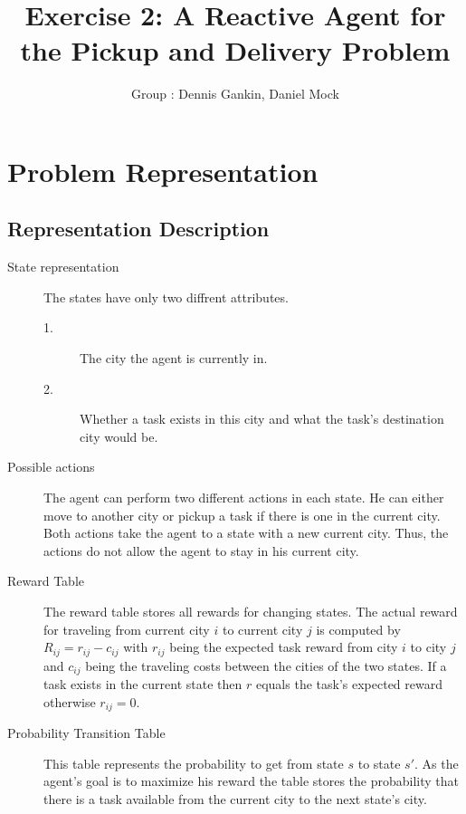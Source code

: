 \documentclass[11pt]{article}
\title{\bf Exercise 2: A Reactive Agent for the Pickup and Delivery Problem}
\author{Group \textnumero 29: Dennis Gankin, Daniel Mock}
\begin{document}
\maketitle

\section{Problem Representation}

\subsection{Representation Description}
\begin{description}
	\item [State representation] The states have only two diffrent attributes.
		\begin{description}
			\item[1.] The city the agent is currently in.
			\item[2.] Whether a task exists in this city and what the task's destination city would be.
		\end{description}
	\item [Possible actions] The agent can perform two different actions in each state. He can either move to another city or pickup a task if there is one in the current city. Both actions take the agent to a state with a new current city. Thus, the actions do not allow the agent to stay in his current city.
	\item[Reward Table] The reward table stores all rewards for changing states. The actual reward for traveling from current city \(i\) to current city \(j\) is computed by \(R_{ij}=r_{ij} - c_{ij} \) with  \(r_{ij}\) being the expected task reward from city \(i\) to city \(j\) and \(c_{ij}\) being the traveling costs between the cities of the two states. If a task exists in the current state then \(r\) equals the task's expected reward otherwise \(r_{ij} =0\). 
	\item[Probability Transition Table] This table represents the probability to get from state \(s\) to state \(s'\). As the agent's goal is to maximize his reward the table stores the probability that there is a task available from the current city to the next state's city.  
\end{description}
\end{document}
